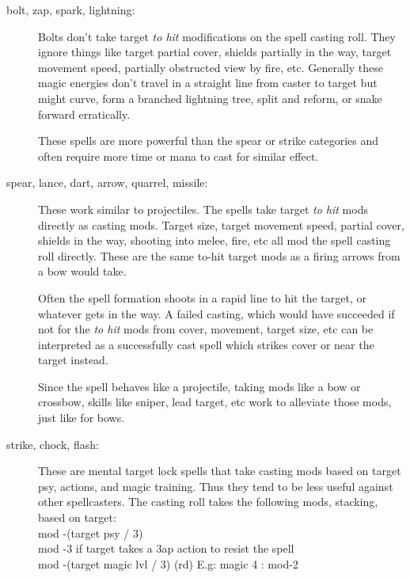 \begin{description}

\item[bolt, zap, spark, lightning:]
Bolts don't take target \emph{to hit} modifications on the spell casting roll. They ignore things like target partial cover, shields partially in the way, target movement speed, partially obstructed view by fire, etc.
Generally these magic energies don't travel in a straight line from caster to target but might curve, form a branched lightning tree, split and reform, or snake forward erratically.

These spells are more powerful than the spear or strike categories and often require more time or mana to cast for similar effect.


\item[spear, lance, dart, arrow, quarrel, missile:]
These work similar to projectiles. The spells take target \emph{to hit} mods directly as casting mods. Target size, target movement speed, partial cover, shields in the way, shooting into melee, fire, etc all mod the spell casting roll directly. These are the same to-hit target mods as a firing arrows from a bow would take. 


Often the spell formation shoots in a rapid line to hit the target, or whatever gets in the way. A failed casting, which would have succeeded if not for the \emph{to hit} mods from cover, movement, target size, etc can be interpreted as a successfully cast spell which strikes cover or near the target instead.


Since the spell behaves like a projectile, taking mods like a bow or crossbow, skills like sniper, lead target, etc work to alleviate those mods, just like for bows.


\item[strike, chock, flash:] 
These are mental target lock spells that take casting mods based on target psy, actions, and magic training. Thus they tend to be less useful against other spellcasters. The casting roll takes the following mods, stacking, based on target:\\
mod -(target psy / 3)\\
mod -3 if target takes a 3ap action to resist the spell\\
mod -(target magic lvl / 3) (rd) E.g: magic 4 : mod-2



\end{description}
